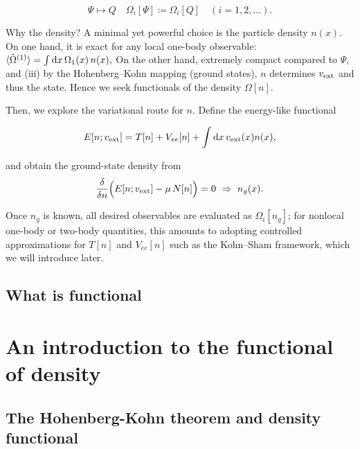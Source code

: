 \begin{equation}
\Psi\mapsto Q \quad \Omega_i[\Psi]\coloneqq \Omega_i[Q] \quad (i=1,2,\ldots).
\label{Q}
\end{equation}

Why the density? A minimal yet powerful choice is the particle density $n(x)$. 
On one hand, it is exact for any local one-body observable: $\braket{\hat{\Omega}^{(1)}}=\int \mathrm{d}x\,\Omega_1(x)\,n(x),$
On the other hand, extremely compact compared to $\Psi$, and (iii) by the Hohenberg--Kohn mapping (ground states), $n$ determines $v_{\rm ext}$ and thus the state. 
Hence we seek functionals of the density $\Omega[n]$.

Then, we explore the variational route for $n$. Define the energy-like functional

\begin{equation}
    E[n;v_{\rm ext}]=T[n]+V_{ee}[n]+\int\mathrm{d}x\,v_{\rm ext}(x)n(x),
\label{energy-like_functional}
\end{equation}

and obtain the ground-state density from
\begin{equation}
    \frac{\delta}{\delta n}\Big(E[n;v_{\rm ext}] - \mu\,N[n]\Big)=0 \ \Rightarrow\ n_g(x).
\label{ground-state_density}
\end{equation}

Once $n_g$ is known, all desired observables are evaluated as $\Omega_i[n_g]$; 
for nonlocal one-body or two-body quantities, this amounts to adopting controlled approximations for $T[n]$ and $V_{ee}[n]$ such as the Kohn--Sham framework, which we will introduce later.

\subsection{What is functional}















\newpage
\section{An introduction to the functional of density}

\subsection{The Hohenberg-Kohn theorem and density functional}

